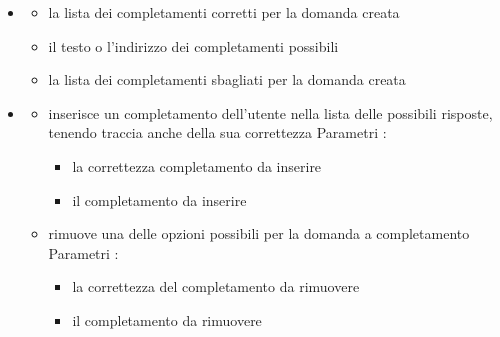 \begin{itemize}
\item {}
\begin{itemize}
\item {}
\newline
la lista dei completamenti corretti per la domanda creata
\item {}
\newline
il testo o l'indirizzo dei completamenti possibili
\item {}
\newline
la lista dei completamenti sbagliati per la domanda creata
\end{itemize}
\item {}
\begin{itemize}
\item {}
\newline
inserisce un completamento dell'utente nella lista delle possibili risposte, tenendo traccia anche della sua correttezza
\newline
Parametri :
\begin{itemize}
\item {}
\newline
la correttezza completamento da inserire
\item {}
\newline
il completamento da inserire
\end{itemize}
\item {}
\newline
rimuove una delle opzioni possibili per la domanda a completamento
\newline
Parametri :
\begin{itemize}
\item {}
\newline
la correttezza del completamento da rimuovere
\item {}
\newline
il completamento da rimuovere
\end{itemize}
\end{itemize}
\end{itemize}
